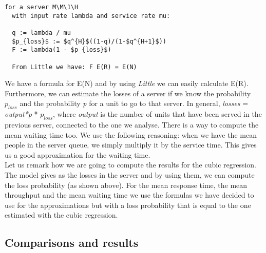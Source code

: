\documentclass[12pt]{article}
\theoremstyle{plain}
\begin{document}
\begin{lstlisting}[frame=single]
  for a server M\M\1\H
  with input rate lambda and service rate mu:

  q := lambda / mu
  $p_{loss}$ := $q^{H}$((1-q)/(1-$q^{H+1}$))
  F := lambda(1 - $p_{loss}$)
  
  From Little we have: F E(R) = E(N)
\end{lstlisting}

We have a formula for E(N) and by using \emph{Little} we can easily calculate
E(R). Furthermore, we can estimate the losses of a server if we know the probability
$p_{loss}$ and the probability \emph{p} for a unit to go to that server. In
general, \emph{losses} = \emph{output*p} * $p_{loss}$, where \emph{output}
is the number of units that have been served in the previous server, connected to
the one we analyse. There is a way to compute the mean waiting time too. We use
the following reasoning: when we have the mean people in the server queue, we
simply multiply it by the service time. This gives us a good approximation for
the waiting time.\\
Let us remark how we are going to compute the results for the cubic regression.
The model gives as the losses in the server and by using them, we can compute
the loss probability (as shown above). For the mean response time, the mean
throughput and the mean waiting time we use the formulas we have decided to use
for the approximations but with a loss probability that is equal to the one
estimated with the cubic regression.\\

\subsection*{Comparisons and results}
\end{document}
